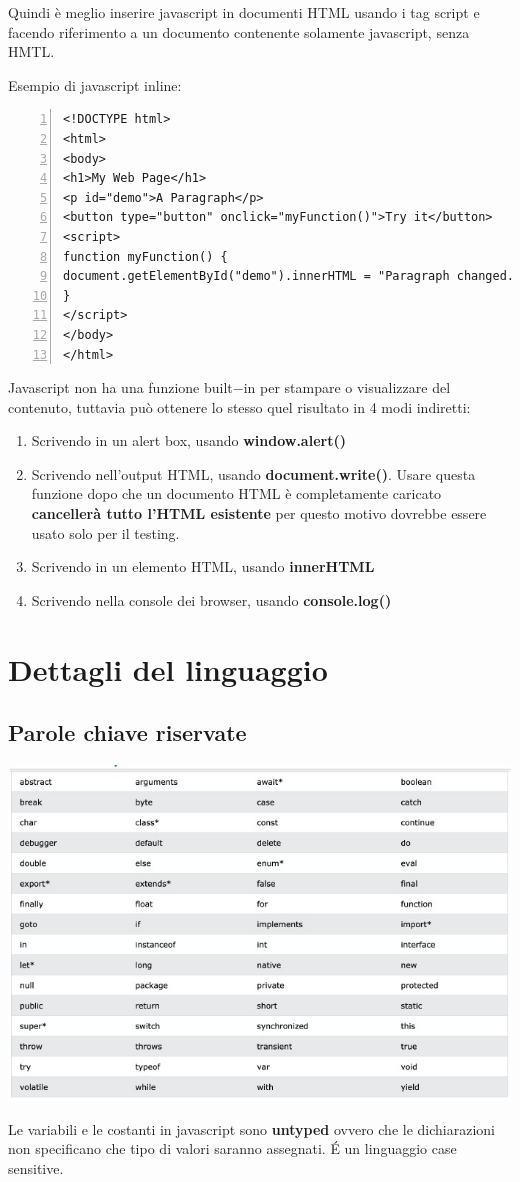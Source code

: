 Quindi è meglio inserire javascript in documenti HTML usando i tag script e facendo riferimento a un documento contenente solamente javascript, senza HMTL.

Esempio di javascript inline:

\begin{Verbatim}[numbers = left, frame=single]
<!DOCTYPE html>
<html>
<body>
<h1>My Web Page</h1>
<p id="demo">A Paragraph</p>
<button type="button" onclick="myFunction()">Try it</button>
<script>
function myFunction() {
document.getElementById("demo").innerHTML = "Paragraph changed.";
}
</script>
</body>
</html>
\end{Verbatim}

Javascript non ha una funzione built$-$in per stampare o visualizzare del contenuto, tuttavia può ottenere lo stesso quel risultato in 4 modi indiretti:
\begin{enumerate}
    \item Scrivendo in un alert box, usando \textbf{window.alert()}
    \item Scrivendo nell'output HTML, usando \textbf{document.write()}. Usare questa funzione dopo che un documento HTML è completamente caricato \textbf{cancellerà tutto l'HTML esistente} per questo motivo dovrebbe essere usato solo per il testing.
    \item Scrivendo in un elemento HTML, usando \textbf{innerHTML}
    \item Scrivendo nella console dei browser, usando \textbf{console.log()}
\end{enumerate}

\section{Dettagli del linguaggio}

\subsection{Parole chiave riservate}
\begin{center}
    \includegraphics[scale=0.4]{Images/TecnologieWeb/8/KeyWordRiservate.jpg}
\end{center}
Le variabili e le costanti in javascript sono \textbf{untyped} ovvero che le dichiarazioni non specificano che tipo di valori saranno assegnati. \'E un linguaggio case sensitive. 


